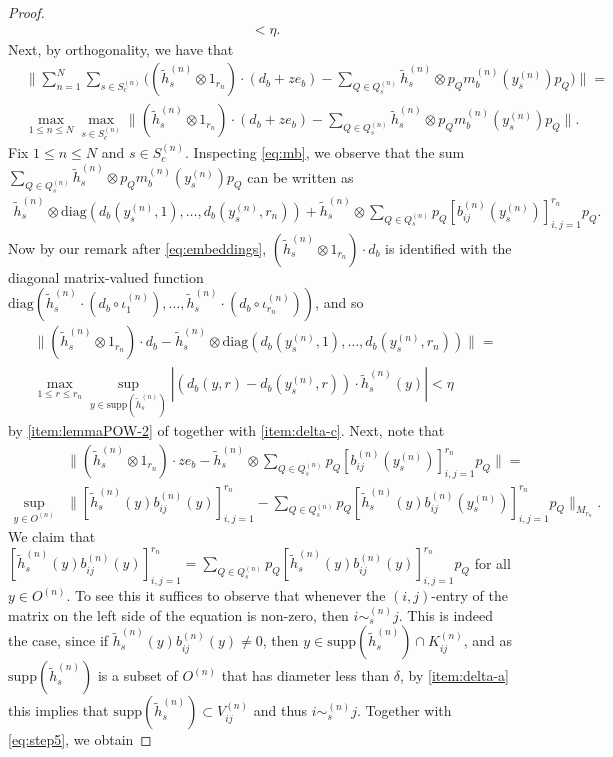 \documentclass[11pt,a4paper]{amsart}
\theoremstyle{definition}
\numberwithin{equation}{section}
\def\supp{\mathrm{supp}}
\begin{document}
\begin{proof}
\begin{align}
&<\eta.\nonumber
\end{align}
Next, by orthogonality, we have that
\begin{align}\label{eq:step3}
&\bigg\|\sum_{n=1}^N\sum_{s\in S_c^{(n)}}\bigg((\tilde{h}_s^{(n)}\otimes 1_{r_n})\cdot (d_b+ze_b) - \sum_{Q\in Q_s^{(n)}}\tilde{h}_s^{(n)}\otimes p_Qm_b^{(n)}(y_s^{(n)})p_Q\bigg)\bigg\|=\\
&\max_{1\le n\le N}\max_{s\in S_c^{(n)}}\bigg\|(\tilde{h}_s^{(n)}\otimes 1_{r_n})\cdot (d_b+ze_b) - \sum_{Q\in Q_s^{(n)}}\tilde{h}_s^{(n)}\otimes p_Qm_b^{(n)}(y_s^{(n)})p_Q\bigg\|.\nonumber
\end{align}
Fix $1\le n\le N$ and $s\in S_c^{(n)}$. Inspecting \eqref{eq:mb}, we observe that the sum $\sum_{Q\in Q_s^{(n)}}\tilde{h}_s^{(n)}\otimes p_Qm_b^{(n)}(y_s^{(n)})p_Q$ can be written as
\begin{align*}
\tilde{h}_s^{(n)}\otimes\mathrm{diag}(d_b(y_s^{(n)},1),\dots,d_b(y_s^{(n)},r_n)) + \tilde{h}_s^{(n)}\otimes \sum_{Q\in Q_s^{(n)}} p_Q[b_{ij}^{(n)}(y_s^{(n)})]_{i,j=1}^{r_n}p_Q.
\end{align*}
Now by our remark after \eqref{eq:embeddings}, $(\tilde{h}_s^{(n)}\otimes 1_{r_n})\cdot d_b$ is identified with the diagonal matrix-valued function $\mathrm{diag}(\tilde{h}_s^{(n)}\cdot (d_b\circ\iota_1^{(n)}),\dots,\tilde{h}_s^{(n)}\cdot (d_b\circ\iota_{r_n}^{(n)}))$, and so
\begin{align}\label{eq:step4}
&\|(\tilde{h}_s^{(n)}\otimes 1_{r_n})\cdot d_b - \tilde{h}_s^{(n)}\otimes \mathrm{diag}(d_b(y_s^{(n)},1),\dots,d_b(y_s^{(n)},r_n))\|=\\
&\max_{1\le r\le r_n}\sup_{y\in \supp(\tilde{h}_s^{(n)})}|(d_b(y,r)-d_b(y_s^{(n)},r))\cdot \tilde{h}_s^{(n)}(y)|<\eta\nonumber
\end{align}
by \ref{item:lemmaPOW-2} of  together with \ref{item:delta-c}. Next, note that
\begin{align}\label{eq:step5}
&\bigg\|(\tilde{h}_s^{(n)}\otimes 1_{r_n})\cdot ze_b - \tilde{h}_s^{(n)}\otimes\sum_{Q\in Q_s^{(n)}} p_Q[b_{ij}^{(n)}(y_s^{(n)})]_{i,j=1}^{r_n}p_Q\bigg\| = \\
\sup_{y\in O^{(n)}}&\bigg\|[\tilde{h}_s^{(n)}(y)b_{ij}^{(n)}(y)]_{i,j=1}^{r_n}-\sum_{Q\in Q_s^{(n)}}p_Q[\tilde{h}_s^{(n)}(y)b_{ij}^{(n)}(y_s^{(n)})]_{i,j=1}^{r_n}p_Q\bigg\|_{M_{r_n}}.\nonumber
\end{align}
We claim that $[\tilde{h}_s^{(n)}(y)b_{ij}^{(n)}(y)]_{i,j=1}^{r_n}=\sum_{Q\in Q_s^{(n)}}p_Q[\tilde{h}_s^{(n)}(y)b_{ij}^{(n)}(y)]_{i,j=1}^{r_n}p_Q$ for all $y\in O^{(n)}$. To see this it suffices to observe that whenever the $(i,j)$-entry of the matrix on the left side of the equation is non-zero, then $i\sim_s^{(n)}j$. This is indeed the case, since if $\tilde{h}_s^{(n)}(y)b_{ij}^{(n)}(y)\ne0$, then $y\in\supp(\tilde{h}_s^{(n)})\cap K_{ij}^{(n)}$, and as $\supp(\tilde{h}_s^{(n)})$ is a subset of $O^{(n)}$ that has diameter less than $\delta$, by \ref{item:delta-a} this implies that $\supp(\tilde{h}_s^{(n)})\subset V_{ij}^{(n)}$ and thus $i\sim_s^{(n)}j$. Together with \eqref{eq:step5}, we obtain

\end{proof}
\end{document}
